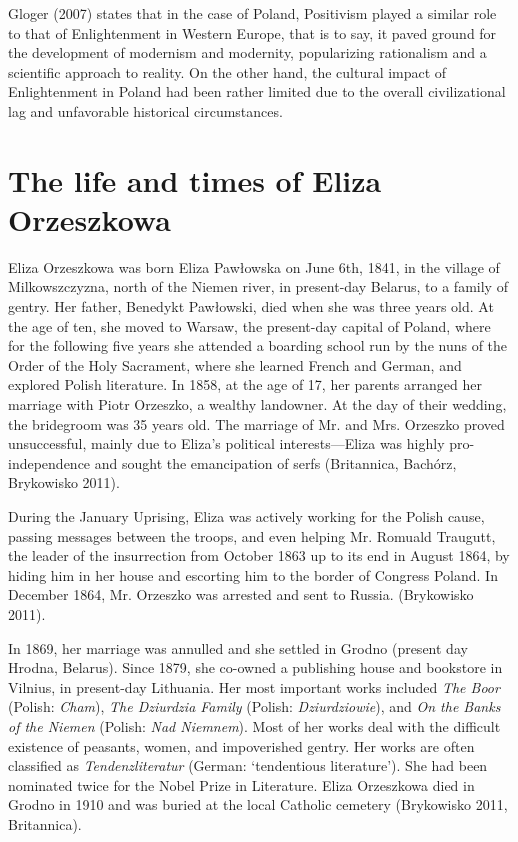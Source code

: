 Gloger (2007) states that in the case of Poland, Positivism played a similar role to that of Enlightenment in Western Europe, that is to say, it paved ground for the development of modernism and modernity, popularizing rationalism and a scientific approach to reality. On the other hand, the cultural impact of Enlightenment in Poland had been rather limited due to the overall civilizational lag and unfavorable historical circumstances.

\section{The life and times of Eliza Orzeszkowa}

Eliza Orzeszkowa was born Eliza Pawłowska on June 6th, 1841, in the village of Milkowszczyzna, north of the Niemen river, in present-day Belarus, to a family of gentry.
Her father, Benedykt Pawłowski, died when she was three years old. 
At the age of ten, she moved to Warsaw, the present-day capital of Poland, where for the following five years she attended a boarding school run by the nuns of the Order of the Holy Sacrament, where she learned French and German, and explored Polish literature.
In 1858, at the age of 17, her parents arranged her marriage with Piotr Orzeszko, a wealthy landowner.
At the day of their wedding, the bridegroom was 35 years old.
The marriage of Mr. and Mrs. Orzeszko proved unsuccessful, mainly due to Eliza's political interests---Eliza was highly pro-independence and sought the emancipation of serfs (Britannica, Bachórz, Brykowisko 2011).

During the January Uprising, Eliza was actively working for the Polish cause, passing messages between the troops, and even helping Mr. Romuald Traugutt, the leader of the insurrection from October 1863 up to its end in August 1864, by hiding him in her house and escorting him to the border of Congress Poland.
In December 1864, Mr. Orzeszko was arrested and sent to Russia.
(Brykowisko 2011).

In 1869, her marriage was annulled and she settled in Grodno (present day Hrodna, Belarus).
Since 1879, she co-owned a publishing house and bookstore in Vilnius, in present-day Lithuania.
Her most important works included \textit{The Boor} (Polish: \textit{Cham}), \textit{The Dziurdzia Family} (Polish: \textit{Dziurdziowie}), and \textit{On the Banks of the Niemen} (Polish: \textit{Nad Niemnem}).
Most of her works deal with the difficult existence of peasants, women, and impoverished gentry.
Her works are often classified as \textit{Tendenzliteratur} (German: `tendentious literature').
She had been nominated twice for the Nobel Prize in Literature.
Eliza Orzeszkowa died in Grodno in 1910 and was buried at the local Catholic cemetery
(Brykowisko 2011, Britannica).

